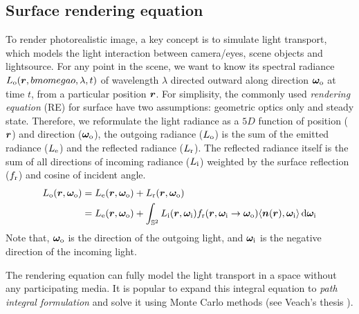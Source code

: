 \subsection{Surface rendering equation}
To render photorealistic image, a key concept is to simulate light transport, which models the light interaction between camera/eyes, scene objects and lightsource. For any point in the scene, we want to know its spectral radiance $L_\mathrm{o}(\bm{r},bmomegao,\lambda,t)$ of wavelength $\lambda$ directed outward along direction $\bm\omega_\mathrm{o}$ at time $t$, from a particular position $\bm{r}$. For simplisity, the commonly used \emph{rendering equation} (RE) \cite{kajiya1986rendering} for surface have two assumptions: geometric optics only and steady state. Therefore, we reformulate the light radiance as a $5D$ function of position ($\bm{r}$) and direction ($\bm\omega_\mathrm{o}$), the outgoing radiance ($L_\mathrm{o}$) is the sum of the emitted radiance ($L_\mathrm{e}$) and the reflected radiance ($L_\mathrm{r}$). The reflected radiance itself is the sum of all directions of incoming radiance ($L_\mathrm{i}$) weighted by the surface reflection ($f_\mathrm{r}$) and cosine of incident angle.     	
\begin{align}
	L_\mathrm{o}(\bm{r},\bm\omega_\mathrm{o}) &= L_\mathrm{e}(\bm{r},\bm\omega_\mathrm{o}) + L_\mathrm{r}(\bm{r},\bm\omega_\mathrm{o}) \\
	&= L_\mathrm{e}(\bm{r},\bm\omega_\mathrm{o}) + 
	\int_{\mathbb{S}^2} L_\mathrm{i}(\bm{r},\bm\omega_\mathrm{i}) f_\mathrm{r}(\bm{r},\bm\omega_\mathrm{i}\rightarrow\bm\omega_\mathrm{o}) {\langle \bm{n}(\bm{r}),\bm\omega_\mathrm{i} \rangle} \,\mathrm{d} \bm\omega_\mathrm{i}
\end{align}
Note that, $\bm\omega_\mathrm{o}$ is the direction of the outgoing light, and $\bm\omega_\mathrm{i}$ is the negative direction of the incoming light. 

The rendering equation can fully model the light transport in a space without any participating media. It is popular to expand this integral equation to \emph{path integral formulation} and solve it using Monte Carlo methods (see Veach's thesis 
\cite{veach1997metropolis}).


